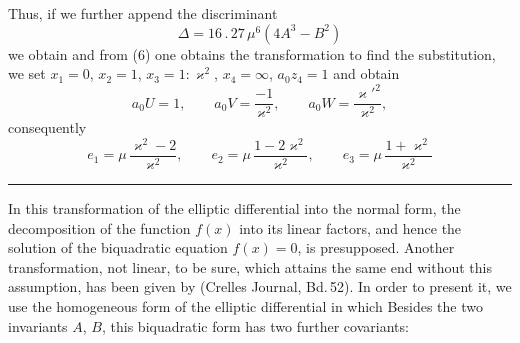 
Thus, if we further append the discriminant
\[
\Delta = 16\,.\,27\,\mu^6(4A^3 - B^2)
\]
we obtain
and from (6) one obtains the transformation
to find the substitution, we set $x_1=0$, $x_2=1$, $x_3=1{:}\varkappa^2$, $x_4=\infty$,
$a_0z_4=1$ and obtain
\[
a_0U = 1, \qquad a_0V = \frac{-1}{\varkappa^2}, \qquad a_0W = \frac{\varkappa'^2}{\varkappa^2},
\]
consequently
\[
e_1 = \mu\,\frac{\varkappa^2-2}{\varkappa^2}, \qquad e_2 = \mu\,\frac{1-2\varkappa^2}{\varkappa^2}, \qquad e_3 = \mu\,\frac{1+\varkappa^2}{\varkappa^2}
\]

\begin{center}\rule{3cm}{0.4pt}\end{center}

In this transformation of the elliptic differential into the  normal form, the decomposition of the function $f(x)$ into its linear factors, and hence the solution of the biquadratic equation $f(x)=0$, is presupposed. Another transformation, not linear, to be sure, which attains the same end without this assumption, has been given by  (Crelles Journal, Bd.\,52). In order to present it, we use the homogeneous form of the elliptic differential
in which
Besides the two invariants $A$, $B$, this biquadratic form has two further covariants:
